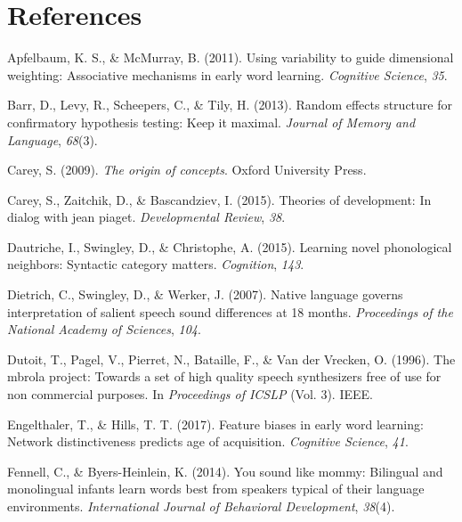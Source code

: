 \documentclass[english,,man]{apa6}
\begin{document}
\hypertarget{references}{%
\section{References}\label{references}}

\setlength{\parindent}{-0.5in}
\setlength{\leftskip}{0.5in}

\hypertarget{refs}{}
\leavevmode\hypertarget{ref-apfelbaum2011}{}%
Apfelbaum, K. S., \& McMurray, B. (2011). Using variability to guide dimensional weighting: Associative mechanisms in early word learning. \emph{Cognitive Science}, \emph{35}.

\leavevmode\hypertarget{ref-barr2013}{}%
Barr, D., Levy, R., Scheepers, C., \& Tily, H. (2013). Random effects structure for confirmatory hypothesis testing: Keep it maximal. \emph{Journal of Memory and Language}, \emph{68}(3).

\leavevmode\hypertarget{ref-carey2009}{}%
Carey, S. (2009). \emph{The origin of concepts}. Oxford University Press.

\leavevmode\hypertarget{ref-carey2015}{}%
Carey, S., Zaitchik, D., \& Bascandziev, I. (2015). Theories of development: In dialog with jean piaget. \emph{Developmental Review}, \emph{38}.

\leavevmode\hypertarget{ref-dautriche2015}{}%
Dautriche, I., Swingley, D., \& Christophe, A. (2015). Learning novel phonological neighbors: Syntactic category matters. \emph{Cognition}, \emph{143}.

\leavevmode\hypertarget{ref-dietrich2007}{}%
Dietrich, C., Swingley, D., \& Werker, J. (2007). Native language governs interpretation of salient speech sound differences at 18 months. \emph{Proceedings of the National Academy of Sciences}, \emph{104}.

\leavevmode\hypertarget{ref-dutoit1996}{}%
Dutoit, T., Pagel, V., Pierret, N., Bataille, F., \& Van der Vrecken, O. (1996). The mbrola project: Towards a set of high quality speech synthesizers free of use for non commercial purposes. In \emph{Proceedings of ICSLP} (Vol. 3). IEEE.

\leavevmode\hypertarget{ref-engelthaler2017}{}%
Engelthaler, T., \& Hills, T. T. (2017). Feature biases in early word learning: Network distinctiveness predicts age of acquisition. \emph{Cognitive Science}, \emph{41}.

\leavevmode\hypertarget{ref-Fennell2014}{}%
Fennell, C., \& Byers-Heinlein, K. (2014). You sound like mommy: Bilingual and monolingual infants learn words best from speakers typical of their language environments. \emph{International Journal of Behavioral Development}, \emph{38}(4).
\end{document}
